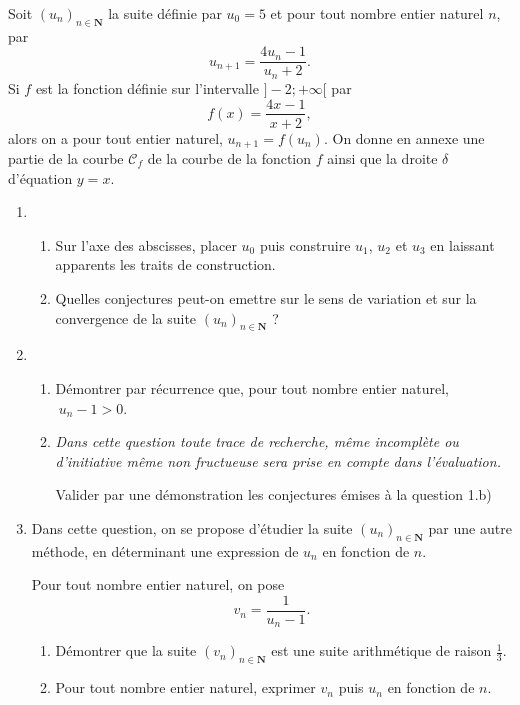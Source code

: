 \documentclass[12pt,a4paper,french]{article}
\newcommand{\N}{\mathbf{N}}
\begin{document}
\begin{question}
  Soit $(u_n)_{n\in\N}$ la suite définie par $u_0 = 5$ et pour tout
  nombre entier naturel $n$, par \[u_{n+1} = \frac{4u_n - 1}{u_n+2}.\]
  Si $f$ est la fonction définie sur l'intervalle $]-2;+\infty[$ par \[
  f(x) = \frac{4x -1}{x+2}, \] alors on a pour tout entier naturel,
  $u_{n+1} = f(u_n)$. On donne en annexe une partie de la courbe
  $\mathcal{C}_f$ de la courbe de la fonction $f$ ainsi que la droite
  $\delta$ d'équation $y=x$.

  \begin{enumerate}
    \item \begin{enumerate}
      \item Sur l'axe des abscisses, placer $u_0$ puis construire
        $u_1$, $u_2$ et $u_3$ en laissant apparents les traits de
        construction.
      \item Quelles conjectures peut-on emettre sur le sens de
        variation et sur la convergence de la suite $(u_n)_{n\in\N}$ ?
    \end{enumerate}
  \item \begin{enumerate}
    \item Démontrer par récurrence que, pour tout nombre entier
      naturel, $\ u_n -1 > 0$.

    \item \emph{Dans cette question toute trace de recherche, même
        incomplète ou d'initiative même non fructueuse sera prise en
      compte dans l'évaluation.}

      Valider par une démonstration les conjectures émises à la
      question 1.b)
  \end{enumerate}
\item Dans cette question, on se propose d'étudier la suite
  $(u_n)_{n\in\N}$ par une autre méthode, en déterminant une
  expression de $u_n$ en fonction de $n$.

  Pour tout nombre entier naturel, on pose \[ v_n = \frac1{u_n -1}.
  \]
  \begin{enumerate}
    \item Démontrer que la suite $(v_n)_{n\in\N}$ est une suite
      arithmétique de raison $\frac13$.

    \item Pour tout nombre entier naturel, exprimer $v_n$ puis $u_n$
      en fonction de $n$.


\end{enumerate}
\end{enumerate}
\end{question}
\end{document}
